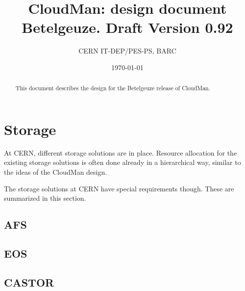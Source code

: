 \documentclass[12pt]{article}
\begin{document}
\thispagestyle{empty}
\title{CloudMan: design document Betelgeuze. Draft Version 0.92}
\author{CERN IT-DEP/PES-PS, BARC}
\date{\today}
\maketitle 
\begin{abstract}
This document describes the design for the Betelgeuze release of CloudMan.

\end{abstract}
%
%
\tableofcontents
\listoffigures 
\listoftables

%
%


%
%


%
%


%
%


%
%
%



\section{Storage}
At CERN, different storage solutions are in place. Resource allocation for the existing storage solutions is often done already in a hierarchical way, similar to the ideas of the CloudMan design. 

The storage solutions at CERN have special requirements though. These are summarized in this section.

\subsection{AFS}

\subsection{EOS}

\subsection{CASTOR}

%
\end{document}
